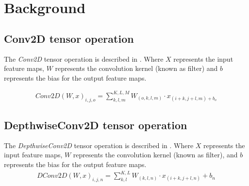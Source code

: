 \section{Background}
\label{sec:background}
\subsection{Conv2D tensor operation}
The \emph{Conv2D} tensor operation is described in . Where $X$ represents the input feature maps, $W$ represents the convolution kernel (known as filter) and $b$ represents the bias for the output feature maps\cite{goodfellow2016deep}.

 	\begin{eqnarray} \label{eq:conv2D}
 	Conv2D\left(W,x\right)_{i,j,o}=\sum_{k,l,m}^{K,L,M}W_{(o,k,l,m)} \cdot x_{(i+k,j+l,m)+b_{o}}
 	\end{eqnarray} 	
 	
\subsection{DepthwiseConv2D tensor operation}
The \emph{DepthwiseConv2D} tensor operation is described in . Where $X$ represents the input feature maps, $W$ represents the convolution kernel (known as filter), and $b$ represents the bias for the output feature maps.
 	\begin{eqnarray} \label{eq:dconv2D}
 	DConv2D\left(W,x\right)_{i,j,n}=\sum_{k,l}^{K,L}W_{(k,l,n)} \cdot x_{(i+k,j+l,n)}+b_{n}
 	\end{eqnarray}